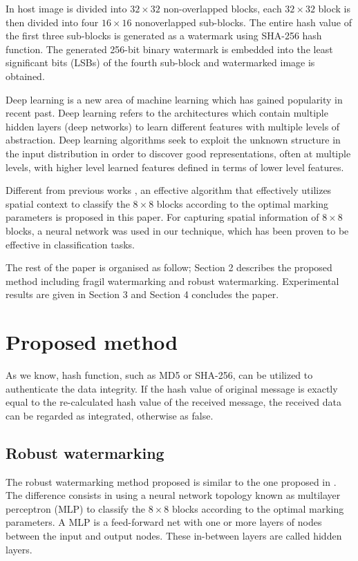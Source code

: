 \documentclass[runningheads]{llncs}
\begin{document}
In \cite{gul2019novel} host image is divided into $32\times 32$ non-overlapped blocks, each $32\times 32$ block is then divided into four $16\times 16$ nonoverlapped sub-blocks. The entire hash value of the first three sub-blocks is generated as a watermark using SHA-256 hash function. The generated 256-bit binary watermark is embedded into the least significant bits (LSBs) of the fourth sub-block and watermarked image is obtained.

Deep learning is a new area of machine learning which has gained popularity in recent past. Deep learning refers to the architectures which contain multiple hidden layers (deep networks) to learn different features with multiple levels of abstraction. Deep learning algorithms seek to exploit the unknown structure in the input distribution in order to discover good representations, often at multiple levels, with higher level learned features defined in terms of lower level features. \cite{wani2019advances}

Different from previous works \cite{avila2018watermarking}, an effective algorithm that effectively utilizes spatial context to classify the $8\times 8$ blocks according to the optimal marking parameters is proposed in this paper. For capturing spatial information of $8\times 8$ blocks, a neural network was used in our technique, which has been proven to be effective in classification tasks.

The rest of the paper is organised as follow; Section 2 describes the proposed method including fragil watermarking and robust watermarking. Experimental results are given in Section 3 and Section 4 concludes the paper.

\section{Proposed method}
As we know, hash function, such as MD5 or SHA-256, can be utilized to authenticate the data integrity. If the hash value of original message is exactly equal to the re-calculated hash value of the received message, the received data can be regarded as integrated, otherwise as false.

\subsection{Robust watermarking}
The robust watermarking method proposed is similar to the one proposed in \cite{avila2018watermarking}. The difference consists in using a neural network topology known as multilayer perceptron (MLP) to classify the $8\times 8$ blocks according to the optimal marking parameters. A MLP is a feed-forward net with one or more layers of nodes between the input and output nodes. These in-between layers are called hidden layers.
\end{document}

